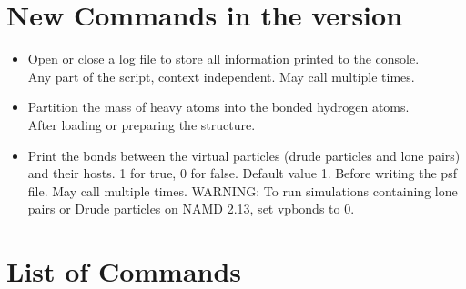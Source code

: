 \section{New Commands in the version \PSFGENVER}

\begin{itemize}

\item {}
{Open or close a log file to store all information printed to the console.}
{\\
}
{Any part of the script, context independent. May call multiple times.}

\item {}
{Partition the mass of heavy atoms into the bonded hydrogen atoms.}
{\\
}
{After loading or preparing the structure.}

\item {}
{Print the bonds between the virtual particles (drude particles and lone pairs) and their hosts.}
{1 for true, 0 for false. Default value 1.}
{Before writing the psf file. May call multiple times. WARNING: To run simulations containing lone pairs or Drude particles on NAMD 2.13, set vpbonds to 0.}

\end{itemize}

\section{List of Commands}


